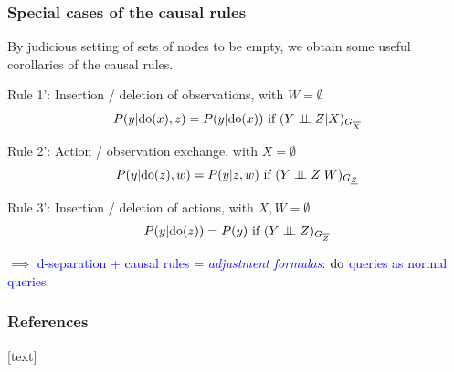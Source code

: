 \begin{frame}
\frametitle{Special cases of the causal rules}

By judicious setting of sets of nodes to be empty, we obtain some useful corollaries of the causal rules.
\newline

Rule 1': Insertion / deletion of observations, with $W = \emptyset$
\begin{equation*}
    P(y | \mathrm{do}(x), z) = P(y | \mathrm{do}(x)) \textrm{ if } (Y \perp\!\!\!\perp Z | X)_{G_{\overline{X}}}
\end{equation*}

Rule 2': Action / observation exchange, with $X = \emptyset$
\begin{equation*}
P(y | \mathrm{do}(z), w) = P(y | z, w) \textrm{ if } (Y \perp\!\!\!\perp Z | W)_{G_{ \underline{Z}}}
\end{equation*}

Rule 3': Insertion / deletion of actions, with $X, W = \emptyset$
\begin{equation*}
P(y | \mathrm{do}(z)) = P(y) \textrm{ if } (Y \perp\!\!\!\perp Z )_{G_{\overline{Z}}}
\end{equation*}

\textcolor{blue}{$\implies$ d-separation + causal rules = \emph{adjustment formulas}: $\mathrm{do}$ queries as normal queries.}
\end{frame}


\begin{frame}[allowframebreaks]
    \frametitle{References}
    [text]
    
    
\end{frame}

